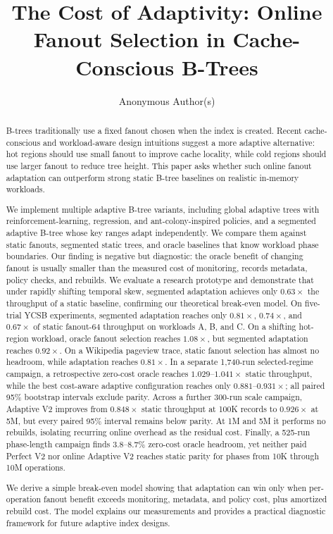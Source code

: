 \documentclass[sigconf,review,anonymous]{acmart}
\begin{document}
\title{The Cost of Adaptivity: Online Fanout Selection in Cache-Conscious B-Trees}

\author{Anonymous Author(s)}

\begin{abstract}
B-trees traditionally use a fixed fanout chosen when the index is created.
Recent cache-conscious and workload-aware design intuitions suggest a more
adaptive alternative: hot regions should use small fanout to improve cache
locality, while cold regions should use larger fanout to reduce tree height.
This paper asks whether such online fanout adaptation can outperform strong
static B-tree baselines on realistic in-memory workloads.

We implement multiple adaptive B-tree variants, including global adaptive
trees with reinforcement-learning, regression, and ant-colony-inspired
policies, and a segmented adaptive B-tree whose key ranges adapt independently.
We compare them against static fanouts, segmented static trees, and oracle
baselines that know workload phase boundaries.  Our finding is negative but
diagnostic: the oracle benefit of changing fanout is usually smaller than the
measured cost of monitoring, records metadata, policy checks, and rebuilds.
We evaluate a research prototype and demonstrate that under rapidly shifting
temporal skew, segmented adaptation
achieves only \(0.63\times\) the throughput of a static baseline, confirming
our theoretical break-even model.
On five-trial YCSB experiments, segmented adaptation reaches only
\(0.81\times\), \(0.74\times\), and \(0.67\times\) of static fanout-64
throughput on workloads A, B, and C.  On a shifting hot-region workload,
oracle fanout selection reaches \(1.08\times\), but segmented adaptation
reaches \(0.92\times\).  On a Wikipedia pageview trace, static fanout
selection has almost no headroom, while adaptation reaches \(0.81\times\).
In a separate 1,740-run selected-regime campaign, a retrospective zero-cost
oracle reaches \(1.029\)--\(1.041\times\) static throughput, while the best
cost-aware adaptive configuration reaches only \(0.881\)--\(0.931\times\);
all paired 95\% bootstrap intervals exclude parity.
Across a further 300-run scale campaign, Adaptive V2 improves from
\(0.848\times\) static throughput at 100K records to \(0.926\times\) at 5M,
but every paired 95\% interval remains below parity.  At 1M and 5M it performs
no rebuilds, isolating recurring online overhead as the residual cost.
Finally, a 525-run phase-length campaign finds 3.8--8.7\% zero-cost oracle
headroom, yet neither paid Perfect V2 nor online Adaptive V2 reaches static
parity for phases from 10K through 10M operations.

We derive a simple break-even model showing that adaptation can win only when
per-operation fanout benefit exceeds monitoring, metadata, and policy cost,
plus amortized rebuild cost.  The model explains our measurements and provides
a practical diagnostic framework for future adaptive index designs.
\end{abstract}
\end{document}
